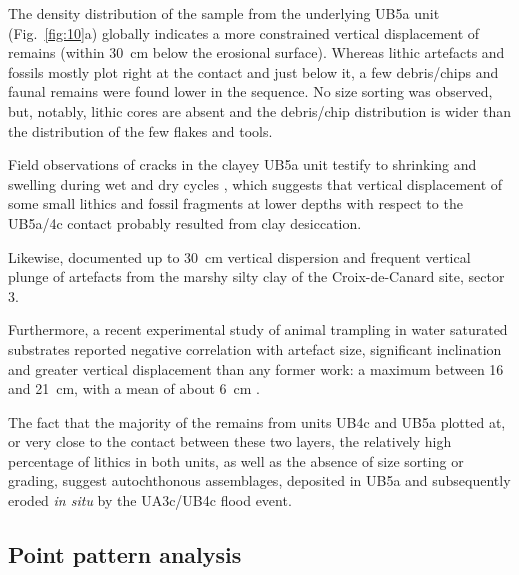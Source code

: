 \documentclass[preprint,authoryear,times]{elsarticle} %
\begin{document}
The density distribution of the sample from the underlying UB5a unit (Fig.~\ref{fig:10}a) globally indicates a more constrained vertical displacement of remains (within 30~cm below the erosional surface). Whereas lithic artefacts and fossils mostly plot right at the contact and just below it, a few debris/chips and faunal remains were found lower in the sequence. No size sorting was observed, but, notably, lithic cores are absent and the debris/chip distribution is wider than the distribution of the few flakes and tools.

Field observations of cracks in the clayey UB5a unit testify to shrinking and swelling during wet and dry cycles \citep{Karkanas}, which suggests that vertical displacement of some small lithics and fossil fragments at lower depths with respect to the UB5a/4c contact probably resulted from clay desiccation.

Likewise, \cite{Lenoble2004} documented up to 30~cm vertical dispersion and frequent vertical plunge of artefacts from the marshy silty clay of the Croix-de-Canard site, sector 3.

Furthermore, a recent experimental study of animal trampling in water saturated substrates reported negative correlation with artefact size, significant inclination and greater vertical displacement than any former work: a maximum between 16 and 21~cm, with a mean of about 6~cm \citep{Eren2010}.

The fact that the majority of the remains from units UB4c and UB5a plotted at, or very close to the contact between these two layers, the relatively high percentage of lithics in both units, as well as the absence of size sorting or grading, suggest autochthonous assemblages, deposited in UB5a and subsequently eroded \emph{in situ} by the UA3c/UB4c flood event. %


\subsection{Point pattern analysis}

\end{document}
